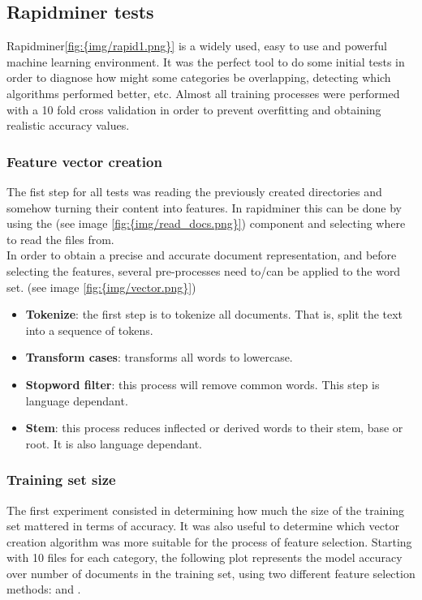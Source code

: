   

\subsection{Rapidminer tests}
Rapidminer\cite{rapidminer}\ref{fig:{img/rapid1.png}} is a widely used, easy to use and powerful machine learning environment.  
It was the perfect tool to do some initial tests in order to diagnose how might some categories be overlapping, detecting which algorithms performed better, etc. Almost all training processes were 
performed with a 10 fold cross validation in order to prevent overfitting and obtaining realistic accuracy values.

\subsubsection{Feature vector creation}
The fist step for all tests was reading the previously created directories and somehow turning their content into features. In rapidminer this can be done by using the 
 (see image \ref{fig:{img/read_docs.png}})
component and selecting where to read the files from.\\
In order to obtain a precise and accurate document representation, and before selecting the features, several pre-processes need to/can be applied to the word set. (see image \ref{fig:{img/vector.png}})
\begin{itemize}
  \item {\bf Tokenize}: the first step is to tokenize all documents. That is, split the text into a sequence of tokens. 
  \item {\bf Transform cases}: transforms all words to lowercase.
  \item {\bf Stopword filter}: this process will remove common words. This step is language dependant.
  \item {\bf Stem}: this process reduces inflected or derived words to their stem, base or root. It is also language dependant.
\end{itemize}


\subsubsection{Training set size}
The first experiment consisted in determining how much the size of the training set mattered in terms of accuracy. It was also useful to determine which vector creation algorithm was
more suitable for the process of feature selection. Starting with 10 files for each category, the following plot represents the model accuracy over number of documents in the training set, 
using two different feature selection methods:  and .

